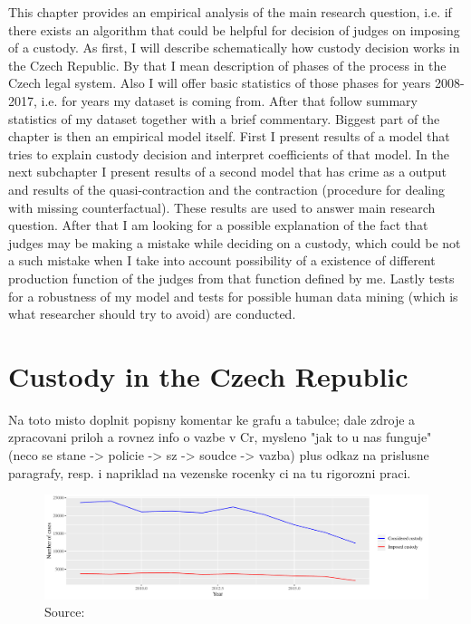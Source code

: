 \documentclass[12pt, twoside,openany]{book} %
\begin{document}
This chapter provides an empirical analysis of the main research question, i.e. if there exists an algorithm that could be helpful for decision of judges on imposing of a custody. As first, I will describe schematically how custody decision works in the Czech Republic. By that I mean description of phases of the process in the Czech legal system. Also I will offer basic statistics of those phases for years 2008-2017, i.e. for years my dataset is coming from. After that follow summary statistics of my dataset together with a brief commentary.\newline
Biggest part of the chapter is then an empirical model itself. First I present results of a model that tries to explain custody decision and interpret coefficients of that model. In the next subchapter I present results of a second model that has crime as a output and results of the quasi-contraction and the contraction (procedure for dealing with missing counterfactual). These results are used to answer main research question. After that I am looking for a possible explanation of the fact that judges may be making a mistake while deciding on a custody, which could be not a such mistake when I take into account possibility of a existence of different production function of the judges from that function defined by me. Lastly tests for a robustness of my model and tests for possible human data mining (which is what researcher should try to avoid) are conducted. 


\section{Custody in the Czech Republic}      %

Na toto misto doplnit popisny komentar ke grafu a tabulce; dale zdroje a zpracovani priloh a rovnez info o 
vazbe v Cr, mysleno "jak to u nas funguje" (neco se stane -> policie -> sz -> soudce -> vazba) plus odkaz na prislusne paragrafy, resp. i napriklad na vezenske rocenky ci na tu rigorozni praci. 


\begin{figure}[H]
\includegraphics[width=\textwidth]{plot_21_1.pdf}
{\small Source: }
\end{figure}
\end{document}
